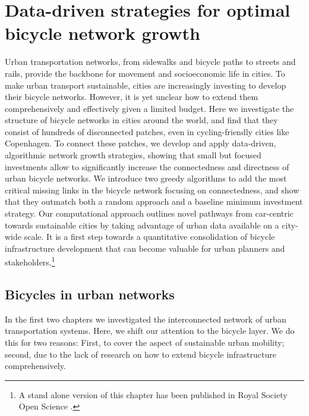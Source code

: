 \chapter{Data-driven strategies for optimal bicycle network growth}\label{ch:BikeGrowth}

Urban transportation networks, from sidewalks and bicycle paths to streets and rails, provide the backbone for movement and socioeconomic life in cities. To make urban transport sustainable, cities are increasingly investing to develop their bicycle networks. However, it is yet unclear how to extend them comprehensively and effectively given a limited budget. Here we investigate the structure of bicycle networks in cities around the world, and find that they consist of hundreds of disconnected patches, even in cycling-friendly cities like Copenhagen. To connect these patches, we develop and apply data-driven, algorithmic network growth strategies, showing that small but focused investments allow to significantly increase the connectedness and directness of urban bicycle networks. We introduce two greedy algorithms to add the most critical missing links in the bicycle network focusing on connectedness, and show that they outmatch both a random approach and a baseline minimum investment strategy. Our computational approach outlines novel pathways from car-centric towards sustainable cities by taking advantage of urban data available on a city-wide scale. It is a first step towards a quantitative consolidation of bicycle infrastructure development that can become valuable for urban planners and stakeholders.\footnote{A stand alone version of this chapter has been published in Royal Society Open Science \cite{natera2020growth}.}
\pagebreak

\section{Bicycles in urban networks}
In the first two chapters we investigated the interconnected network of urban transportation systems. Here, we shift our attention to the bicycle layer. We do this for two reasons: First, to cover the aspect of sustainable urban mobility; second, due to the lack of research on how to extend bicycle infrastructure comprehensively.


